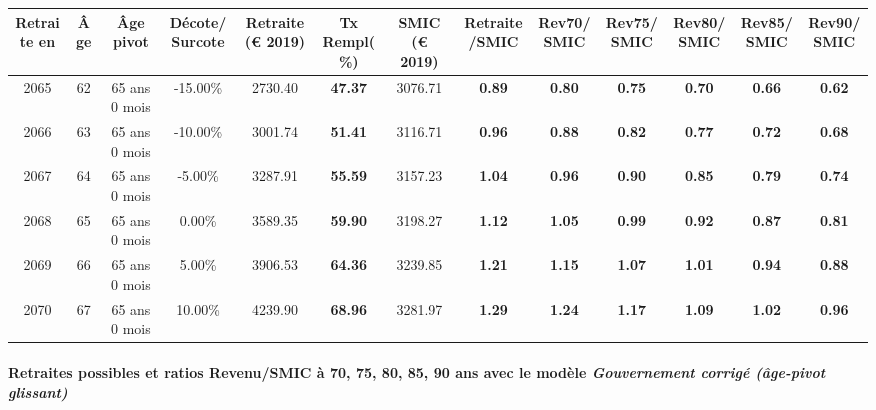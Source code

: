 { \scriptsize \begin{center} 
\begin{tabular}[htb]{|c|c||c|c||c|c||c||c|c|c|c|c|c|} 
\hline 
 Retraite en &  Âge &  Âge pivot &  Décote/Surcote &  Retraite (\euro{} 2019) &  Tx Rempl(\%) &  SMIC (\euro{} 2019) &  Retraite/SMIC &  Rev70/SMIC &  Rev75/SMIC &  Rev80/SMIC &  Rev85/SMIC &  Rev90/SMIC \\ 
\hline \hline 
 2065 &  62 &  65 ans 0 mois &  -15.00\% &  2730.40 &  {\bf 47.37} &  3076.71 &  {\bf {\color{red} 0.89}} &  {\bf {\color{red} 0.80}} &  {\bf {\color{red} 0.75}} &  {\bf {\color{red} 0.70}} &  {\bf {\color{red} 0.66}} &  {\bf {\color{red} 0.62}} \\ 
\hline 
 2066 &  63 &  65 ans 0 mois &  -10.00\% &  3001.74 &  {\bf 51.41} &  3116.71 &  {\bf {\color{red} 0.96}} &  {\bf {\color{red} 0.88}} &  {\bf {\color{red} 0.82}} &  {\bf {\color{red} 0.77}} &  {\bf {\color{red} 0.72}} &  {\bf {\color{red} 0.68}} \\ 
\hline 
 2067 &  64 &  65 ans 0 mois &  -5.00\% &  3287.91 &  {\bf 55.59} &  3157.23 &  {\bf 1.04} &  {\bf {\color{red} 0.96}} &  {\bf {\color{red} 0.90}} &  {\bf {\color{red} 0.85}} &  {\bf {\color{red} 0.79}} &  {\bf {\color{red} 0.74}} \\ 
\hline 
 2068 &  65 &  65 ans 0 mois &  0.00\% &  3589.35 &  {\bf 59.90} &  3198.27 &  {\bf 1.12} &  {\bf 1.05} &  {\bf {\color{red} 0.99}} &  {\bf {\color{red} 0.92}} &  {\bf {\color{red} 0.87}} &  {\bf {\color{red} 0.81}} \\ 
\hline 
 2069 &  66 &  65 ans 0 mois &  5.00\% &  3906.53 &  {\bf 64.36} &  3239.85 &  {\bf 1.21} &  {\bf 1.15} &  {\bf 1.07} &  {\bf 1.01} &  {\bf {\color{red} 0.94}} &  {\bf {\color{red} 0.88}} \\ 
\hline 
 2070 &  67 &  65 ans 0 mois &  10.00\% &  4239.90 &  {\bf 68.96} &  3281.97 &  {\bf 1.29} &  {\bf 1.24} &  {\bf 1.17} &  {\bf 1.09} &  {\bf 1.02} &  {\bf {\color{red} 0.96}} \\ 
\hline 
\hline 
\end{tabular} 
\end{center} } 
\paragraph{Retraites possibles et ratios Revenu/SMIC à 70, 75, 80, 85, 90 ans avec le modèle \emph{Gouvernement corrigé (âge-pivot glissant)}}  
 

